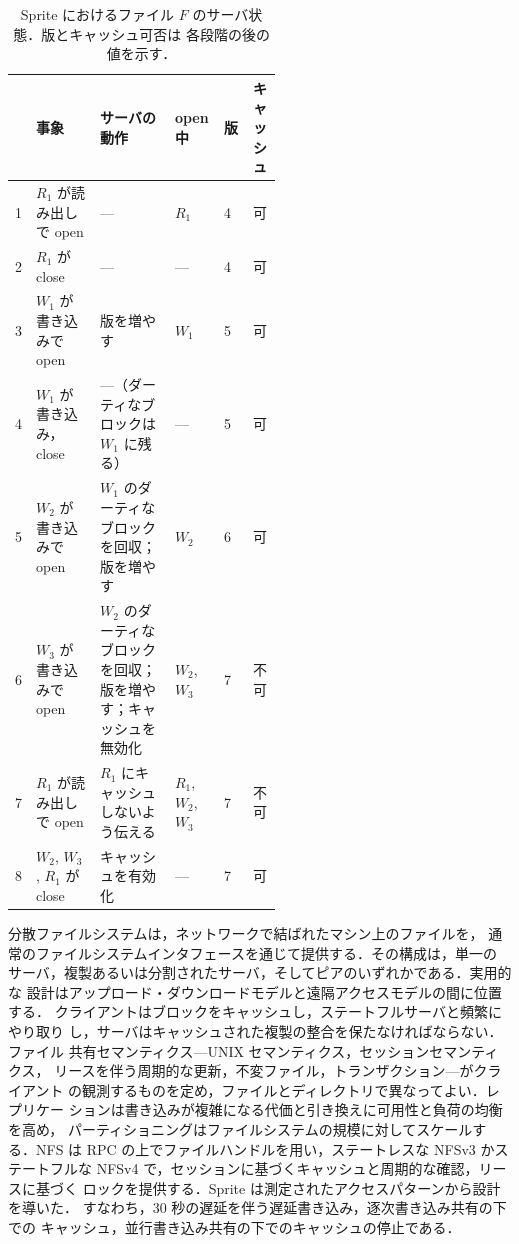 \documentclass[../main.tex]{subfiles}
\begin{document}
\begin{table}[htbp]
  \centering
  \caption{Sprite におけるファイル $F$ のサーバ状態．版とキャッシュ可否は
    各段階の後の値を示す．}
  \label{tab:l14-sprite-trace}
  \small
  \begin{tabular}{@{}r>{\raggedright\arraybackslash}p{0.24\linewidth}>{\raggedright\arraybackslash}p{0.29\linewidth}llc@{}}
    \toprule
    & 事象 & サーバの動作 & open 中 & 版 & キャッシュ \\
    \midrule
    1 & $R_1$ が読み出しで open & --- & $R_1$ & 4 & 可 \\
    2 & $R_1$ が close & --- & --- & 4 & 可 \\
    3 & $W_1$ が書き込みで open & 版を増やす & $W_1$ & 5 & 可 \\
    4 & $W_1$ が書き込み，close & ---（ダーティなブロックは $W_1$ に残る）
      & --- & 5 & 可 \\
    5 & $W_2$ が書き込みで open & $W_1$ のダーティなブロックを回収；
      版を増やす & $W_2$ & 6 & 可 \\
    6 & $W_3$ が書き込みで open & $W_2$ のダーティなブロックを回収；
      版を増やす；キャッシュを無効化 & $W_2$, $W_3$ & 7 & 不可 \\
    7 & $R_1$ が読み出しで open & $R_1$ にキャッシュしないよう伝える &
      $R_1$, $W_2$, $W_3$ & 7 & 不可 \\
    8 & $W_2$, $W_3$, $R_1$ が close & キャッシュを有効化 & --- & 7 & 可 \\
    \bottomrule
  \end{tabular}
\end{table}

\begin{keypoint}[章のまとめ]
  分散ファイルシステムは，ネットワークで結ばれたマシン上のファイルを，
  通常のファイルシステムインタフェースを通じて提供する．その構成は，単一の
  サーバ，複製あるいは分割されたサーバ，そしてピアのいずれかである．実用的な
  設計はアップロード・ダウンロードモデルと遠隔アクセスモデルの間に位置する．
  クライアントはブロックをキャッシュし，ステートフルサーバと頻繁にやり取り
  し，サーバはキャッシュされた複製の整合を保たなければならない．ファイル
  共有セマンティクス---UNIX セマンティクス，セッションセマンティクス，
  リースを伴う周期的な更新，不変ファイル，トランザクション---がクライアント
  の観測するものを定め，ファイルとディレクトリで異なってよい．レプリケー
  ションは書き込みが複雑になる代価と引き換えに可用性と負荷の均衡を高め，
  パーティショニングはファイルシステムの規模に対してスケールする．NFS は
  RPC の上でファイルハンドルを用い，ステートレスな NFSv3 かステートフルな
  NFSv4 で，セッションに基づくキャッシュと周期的な確認，リースに基づく
  ロックを提供する．Sprite は測定されたアクセスパターンから設計を導いた．
  すなわち，30 秒の遅延を伴う遅延書き込み，逐次書き込み共有の下での
  キャッシュ，並行書き込み共有の下でのキャッシュの停止である．
\end{keypoint}
\end{document}
